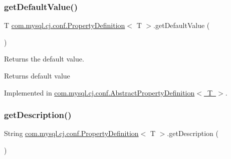 \mbox{\label{interfacecom_1_1mysql_1_1cj_1_1conf_1_1_property_definition_a8e30238016964be2b882a2a9cbffc6a1}} 
\subsubsection{\texorpdfstring{get\+Default\+Value()}{getDefaultValue()}}
{\footnotesize\ttfamily T \mbox{\hyperlink{interfacecom_1_1mysql_1_1cj_1_1conf_1_1_property_definition}{com.\+mysql.\+cj.\+conf.\+Property\+Definition}}$<$ T $>$.get\+Default\+Value (\begin{DoxyParamCaption}{ }\end{DoxyParamCaption})}

Returns the default value.

\begin{DoxyReturn}{Returns}
default value 
\end{DoxyReturn}


Implemented in \mbox{\hyperlink{classcom_1_1mysql_1_1cj_1_1conf_1_1_abstract_property_definition_a3ed1c7b670a446214f7e08b450c8688c}{com.\+mysql.\+cj.\+conf.\+Abstract\+Property\+Definition$<$ T $>$}}.

\mbox{\label{interfacecom_1_1mysql_1_1cj_1_1conf_1_1_property_definition_a0bdca9976b161458af766cc1e6929cf6}} 
\subsubsection{\texorpdfstring{get\+Description()}{getDescription()}}
{\footnotesize\ttfamily String \mbox{\hyperlink{interfacecom_1_1mysql_1_1cj_1_1conf_1_1_property_definition}{com.\+mysql.\+cj.\+conf.\+Property\+Definition}}$<$ T $>$.get\+Description (\begin{DoxyParamCaption}{ }\end{DoxyParamCaption})}

